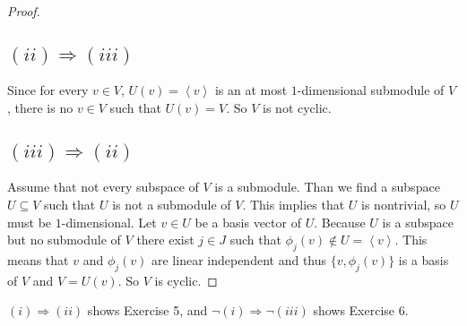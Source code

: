 \documentclass[a4paper,10pt]{article}
\newcommand{\gen}[1]{\left\langle#1\right\rangle}
\begin{document}
\begin{proof}
\subsection*{$(ii) \Rightarrow (iii)$}
Since for every $v \in V$, $U(v) = \gen{v}$ is an at most $1$-dimensional submodule of $V$, there is no $v \in V$ such that $U(v) = V$. So $V$ is not cyclic.

\subsection*{$(iii) \Rightarrow (ii)$}
Assume that not every subspace of $V$ is a submodule. Than we find a subspace $U \subseteq V$ such that $U$ is not a submodule of $V$. This implies that $U$ is nontrivial, so $U$ must be $1$-dimensional. Let $v \in U$ be a basis vector of $U$. Because $U$ is a subspace but no submodule of $V$ there exist $j \in J$ such that $\phi_j(v) \not \in U = \gen{v}$. This means that $v$ and $\phi_j(v)$ are linear independent and thus $\{v,\phi_j(v)\}$ is a basis of $V$ and $V = U(v)$. So $V$ is cyclic.
\end{proof}

$(i) \Rightarrow (ii)$ shows Exercise 5, and $\neg (i) \Rightarrow \neg (iii)$ shows Exercise 6.
\end{document}
